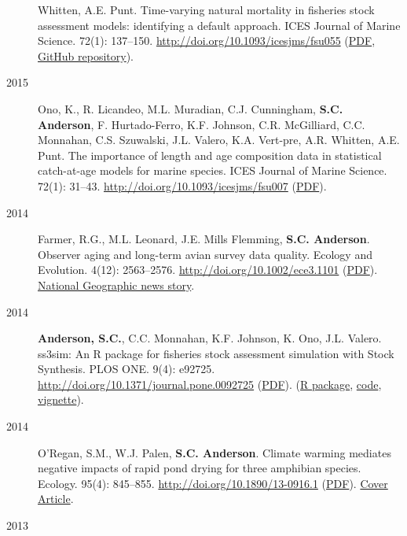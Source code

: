 \begin{description}
Whitten, A.E. Punt. Time-varying natural mortality in fisheries stock
assessment models: identifying a default approach. ICES Journal of
Marine Science. 72(1): 137--150.
\url{http://doi.org/10.1093/icesjms/fsu055}
(\href{http://icesjms.oxfordjournals.org/content/early/2014/04/09/icesjms.fsu055.full.pdf?keytype=ref\&ijkey=NEXmZIkz3289u3z}{PDF},
\href{https://github.com/ss3sim/natural-mortality}{GitHub repository}).
\item[2015]
Ono, K., R. Licandeo, M.L. Muradian, C.J. Cunningham, \textbf{S.C.
Anderson}, F. Hurtado-Ferro, K.F. Johnson, C.R. McGilliard, C.C.
Monnahan, C.S. Szuwalski, J.L. Valero, K.A. Vert-pre, A.R. Whitten, A.E.
Punt. The importance of length and age composition data in statistical
catch-at-age models for marine species. ICES Journal of Marine Science.
72(1): 31--43. \url{http://doi.org/10.1093/icesjms/fsu007}
(\href{https://dl.dropboxusercontent.com/u/254940/papers/Ono_etal_2014_importance_of_length_and_age_composition_data.pdf}{PDF}).
\item[2014]
Farmer, R.G., M.L. Leonard, J.E. Mills Flemming, \textbf{S.C. Anderson}.
Observer aging and long-term avian survey data quality. Ecology and
Evolution. 4(12): 2563--2576. \url{http://doi.org/10.1002/ece3.1101}
(\href{http://onlinelibrary.wiley.com/doi/10.1002/ece3.1101/pdf}{PDF}).
\href{http://news.nationalgeographic.com/news/2014/08/140805-aging-birders-breeding-bird-survey-volunteers-science/}{National
Geographic news story}.
\item[2014]
\textbf{Anderson, S.C.}, C.C. Monnahan, K.F. Johnson, K. Ono, J.L.
Valero. ss3sim: An R package for fisheries stock assessment simulation
with Stock Synthesis. PLOS ONE. 9(4): e92725.
\url{http://doi.org/10.1371/journal.pone.0092725}
(\href{http://www.plosone.org/article/fetchObject.action?uri=info\%3Adoi\%2F10.1371\%2Fjournal.pone.0092725\&representation=PDF}{PDF}).
(\href{http://cran.r-project.org/web/packages/ss3sim/index.html}{R
package}, \href{https://github.com/ss3sim/ss3sim}{code},
\href{https://dl.dropboxusercontent.com/u/254940/ss3sim-vignette.pdf}{vignette}).
\item[2014]
O'Regan, S.M., W.J. Palen, \textbf{S.C. Anderson}. Climate warming
mediates negative impacts of rapid pond drying for three amphibian
species. Ecology. 95(4): 845--855.
\url{http://doi.org/10.1890/13-0916.1}
(\href{http://www.esajournals.org/doi/pdf/10.1890/13-0916.1}{PDF}).
\href{http://www.esajournals.org/userimages/ContentEditor/1398099670397/i0012-9658-95-4-cov.pdf}{Cover
Article}.
\item[2013]

\end{description}
